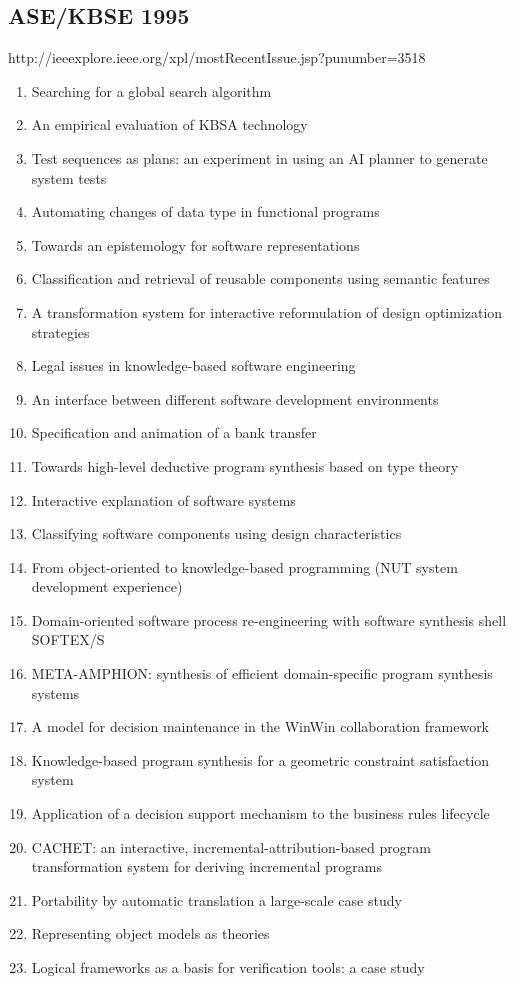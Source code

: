 \subsection{ASE/KBSE 1995}

http://ieeexplore.ieee.org/xpl/mostRecentIssue.jsp?punumber=3518

\begin{enumerate}[itemsep=-1ex]
  \item Searching for a global search algorithm
  \item An empirical evaluation of KBSA technology
  \item Test sequences as plans: an experiment in using an AI planner to generate system tests
  \item Automating changes of data type in functional programs
  \item Towards an epistemology for software representations
  \item Classification and retrieval of reusable components using semantic features
  \item A transformation system for interactive reformulation of design optimization strategies
  \item Legal issues in knowledge-based software engineering
  \item An interface between different software development environments
  \item Specification and animation of a bank transfer
  \item Towards high-level deductive program synthesis based on type theory
  \item Interactive explanation of software systems
  \item Classifying software components using design characteristics
  \item From object-oriented to knowledge-based programming (NUT system development experience)
  \item Domain-oriented software process re-engineering with software synthesis shell SOFTEX/S
  \item META-AMPHION: synthesis of efficient domain-specific program synthesis systems
  \item A model for decision maintenance in the WinWin collaboration framework
  \item Knowledge-based program synthesis for a geometric constraint satisfaction system
  \item Application of a decision support mechanism to the business rules lifecycle
  \item CACHET: an interactive, incremental-attribution-based program transformation system for deriving incremental programs
  \item Portability by automatic translation a large-scale case study
  \item Representing object models as theories
  \item Logical frameworks as a basis for verification tools: a case study 
\end{enumerate}

